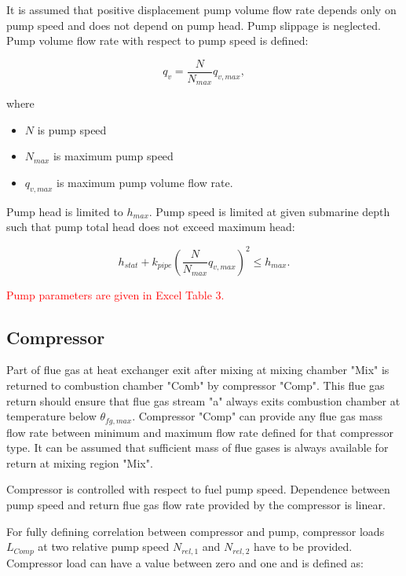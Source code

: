 \documentclass[openany]{book}
\begin{document}
	\noindent
	It is assumed that positive displacement pump volume flow rate depends only 
	on pump speed and does not depend on pump head. Pump slippage is neglected. 
	Pump volume flow rate with respect to pump speed is defined:
	
	\begin{equation}\label{eq:pump_vol_flow}
	q_v = \frac{N}{N_{max}} q_{v,max},
	\end{equation}
	
	\noindent
	where
	
	\begin{itemize}
		\item $N$ is pump speed
		\item $N_{max}$ is maximum pump speed
		\item $q_{v,max}$ is maximum pump volume flow rate.
	\end{itemize}
	
	\noindent
	Pump head is limited to $h_{max}$. Pump speed is limited at given submarine 
	depth such that pump total head does not exceed maximum head:
	
	\begin{equation}\label{eq:total_head_limit}
	h_{stat} + k_{pipe} \left( \frac{N}{N_{max}} q_{v,max} \right)^2 \leq 
	h_{max}.
	\end{equation}
	
	\noindent
	\textcolor{red}{Pump parameters are given in Excel Table 3.}
	
	\subsection{Compressor}
	
	Part of flue gas at heat exchanger exit after mixing at mixing chamber 
	"Mix" is returned to combustion chamber "Comb" by compressor "Comp". This 
	flue gas return should ensure that flue gas stream "a" always exits 
	combustion chamber at temperature below $\theta_{fg,max}$. Compressor 
	"Comp" can provide any flue gas mass flow rate between minimum and maximum 
	flow rate defined for that compressor type. It can be assumed that 
	sufficient mass of flue gases is always available for return at mixing 
	region "Mix".
	
	Compressor is controlled with respect to fuel pump speed.  Dependence 
	between pump speed and return flue gas flow rate provided by the compressor 
	is linear. 
	
	For fully defining correlation between compressor and pump, compressor 
	loads $L_{Comp}$ at two relative pump speed $N_{rel,1}$ and $N_{rel,2}$ 
	have to be provided. Compressor load can have a value between zero and one 
	and is defined as:
	
\end{document}
